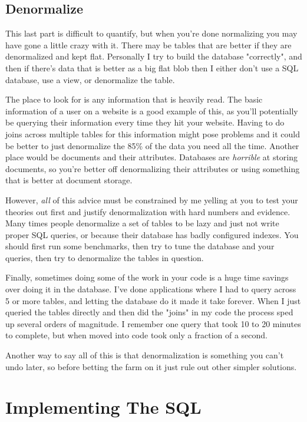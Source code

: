 \subsection{Denormalize}

This last part is difficult to quantify, but when you're done normalizing you may have
gone a little crazy with it.  There may be tables that are better if they are denormalized
and kept flat.  Personally I try to build the database "correctly", and then if there's
data that is better as a big flat blob then I either don't use a SQL database, use a view,
or denormalize the table.

The place to look for is any information that is heavily read.  The basic information of
a user on a website is a good example of this, as you'll potentially be querying their
information every time they hit your website.  Having to do joins across multiple tables
for this information might pose problems and it could be better to just denormalize the
85\% of the data you need all the time.  Another place would be documents and their
attributes.  Databases are \emph{horrible} at storing documents, so you're better off
denormalizing their attributes or using something that is better at document storage.

However, \emph{all} of this advice must be constrained by me yelling at you to test your
theories out first and justify denormalization with hard numbers and evidence.  Many times
people denormalize a set of tables to be lazy and just not write proper SQL queries, or because
their database has badly configured indexes.  You should first run some benchmarks, then
try to tune the database and your queries, then try to denormalize the tables in question.

Finally, sometimes doing some of the work in your code is a huge time savings over doing
it in the database.  I've done applications where I had to query across 5 or more tables,
and letting the database do it made it take forever.  When I just queried the tables directly
and then did the "joins" in my code the process sped up several orders of magnitude.  I remember
one query that took 10 to 20 minutes to complete, but when moved into code took only a
fraction of a second.

Another way to say all of this is that denormalization is something you can't undo later,
so before betting the farm on it just rule out other simpler solutions.

\section{Implementing The SQL}


